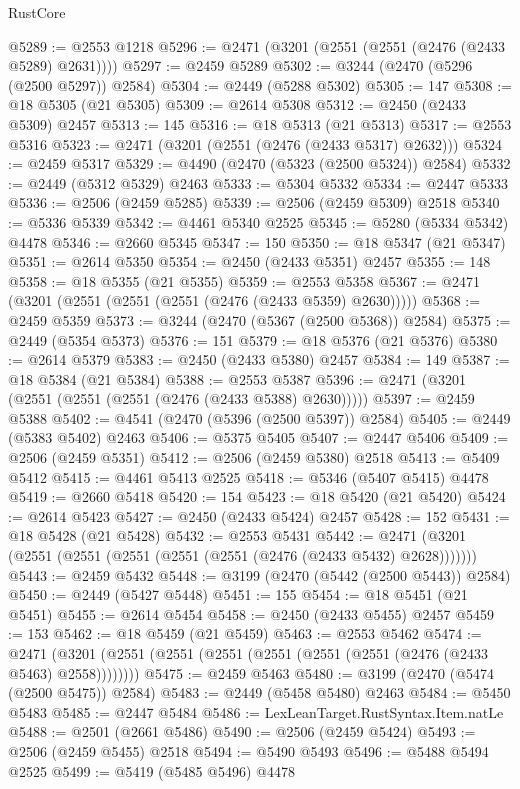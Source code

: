 \begin{lexlean}{RustCore}
\begin{coremodule}
@5289 := @2553 @1218
@5296 := @2471 (@3201 (@2551 (@2551 (@2476 (@2433 @5289) @2631))))
@5297 := @2459 @5289
@5302 := @3244 (@2470 (@5296 (@2500 @5297)) @2584)
@5304 := @2449 (@5288 @5302)
@5305 := 147
@5308 := @18 @5305 (@21 @5305)
@5309 := @2614 @5308
@5312 := @2450 (@2433 @5309) @2457
@5313 := 145
@5316 := @18 @5313 (@21 @5313)
@5317 := @2553 @5316
@5323 := @2471 (@3201 (@2551 (@2476 (@2433 @5317) @2632)))
@5324 := @2459 @5317
@5329 := @4490 (@2470 (@5323 (@2500 @5324)) @2584)
@5332 := @2449 (@5312 @5329) @2463
@5333 := @5304 @5332
@5334 := @2447 @5333
@5336 := @2506 (@2459 @5285)
@5339 := @2506 (@2459 @5309) @2518
@5340 := @5336 @5339
@5342 := @4461 @5340 @2525
@5345 := @5280 (@5334 @5342) @4478
@5346 := @2660 @5345
@5347 := 150
@5350 := @18 @5347 (@21 @5347)
@5351 := @2614 @5350
@5354 := @2450 (@2433 @5351) @2457
@5355 := 148
@5358 := @18 @5355 (@21 @5355)
@5359 := @2553 @5358
@5367 := @2471 (@3201 (@2551 (@2551 (@2551 (@2476 (@2433 @5359) @2630)))))
@5368 := @2459 @5359
@5373 := @3244 (@2470 (@5367 (@2500 @5368)) @2584)
@5375 := @2449 (@5354 @5373)
@5376 := 151
@5379 := @18 @5376 (@21 @5376)
@5380 := @2614 @5379
@5383 := @2450 (@2433 @5380) @2457
@5384 := 149
@5387 := @18 @5384 (@21 @5384)
@5388 := @2553 @5387
@5396 := @2471 (@3201 (@2551 (@2551 (@2551 (@2476 (@2433 @5388) @2630)))))
@5397 := @2459 @5388
@5402 := @4541 (@2470 (@5396 (@2500 @5397)) @2584)
@5405 := @2449 (@5383 @5402) @2463
@5406 := @5375 @5405
@5407 := @2447 @5406
@5409 := @2506 (@2459 @5351)
@5412 := @2506 (@2459 @5380) @2518
@5413 := @5409 @5412
@5415 := @4461 @5413 @2525
@5418 := @5346 (@5407 @5415) @4478
@5419 := @2660 @5418
@5420 := 154
@5423 := @18 @5420 (@21 @5420)
@5424 := @2614 @5423
@5427 := @2450 (@2433 @5424) @2457
@5428 := 152
@5431 := @18 @5428 (@21 @5428)
@5432 := @2553 @5431
@5442 := @2471 (@3201 (@2551 (@2551 (@2551 (@2551 (@2551 (@2476 (@2433 @5432) @2628)))))))
@5443 := @2459 @5432
@5448 := @3199 (@2470 (@5442 (@2500 @5443)) @2584)
@5450 := @2449 (@5427 @5448)
@5451 := 155
@5454 := @18 @5451 (@21 @5451)
@5455 := @2614 @5454
@5458 := @2450 (@2433 @5455) @2457
@5459 := 153
@5462 := @18 @5459 (@21 @5459)
@5463 := @2553 @5462
@5474 := @2471 (@3201 (@2551 (@2551 (@2551 (@2551 (@2551 (@2551 (@2476 (@2433 @5463) @2558))))))))
@5475 := @2459 @5463
@5480 := @3199 (@2470 (@5474 (@2500 @5475)) @2584)
@5483 := @2449 (@5458 @5480) @2463
@5484 := @5450 @5483
@5485 := @2447 @5484
@5486 := LexLeanTarget.RustSyntax.Item.natLe
@5488 := @2501 (@2661 @5486)
@5490 := @2506 (@2459 @5424)
@5493 := @2506 (@2459 @5455) @2518
@5494 := @5490 @5493
@5496 := @5488 @5494 @2525
@5499 := @5419 (@5485 @5496) @4478

\end{coremodule}
\end{lexlean}
